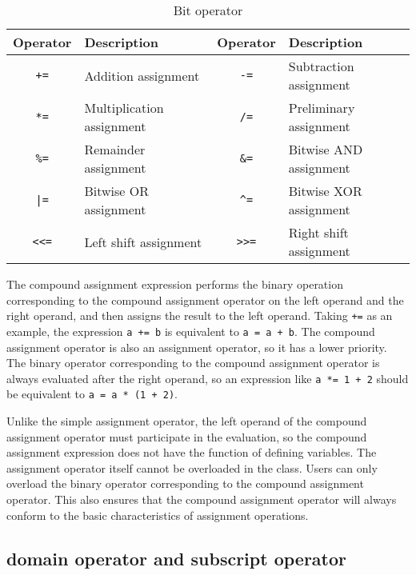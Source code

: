 \begin{table}[htb]
    \centering
    \setlength{\tabcolsep}{10mm}
    \begin{tabular}{clcl} \toprule
        \textbf{Operator} & \textbf{Description} & \textbf{Operator} & \textbf{Description} \\ \midrule
        \texttt{+=} & Addition assignment & \texttt{-=} & Subtraction assignment \\
        \texttt{*=} & Multiplication assignment & \texttt{/=} & Preliminary assignment \\
        \texttt{\%=} & Remainder assignment & \texttt{\&=} & Bitwise AND assignment \\
        \texttt{|=} & Bitwise OR assignment & \texttt{\textasciicircum=} & Bitwise XOR assignment \\
        \texttt{<<=} & Left shift assignment & \texttt{>>=} & Right shift assignment \\
        \bottomrule
    \end{tabular}
    \caption{Bit operator}
    \label{tab::compound_assign}
\end{table}

The compound assignment expression performs the binary operation corresponding to the compound assignment operator on the left operand and the right operand, and then assigns the result to the left operand. Taking \texttt{+=} as an example, the expression \texttt{a += b} is equivalent to \texttt{a = a + b}. The compound assignment operator is also an assignment operator, so it has a lower priority. The binary operator corresponding to the compound assignment operator is always evaluated after the right operand, so an expression like \texttt{a *= 1 + 2} should be equivalent to \texttt{a = a * (1 + 2)}.

Unlike the simple assignment operator, the left operand of the compound assignment operator must participate in the evaluation, so the compound assignment expression does not have the function of defining variables. The assignment operator itself cannot be overloaded in the class. Users can only overload the binary operator corresponding to the compound assignment operator. This also ensures that the compound assignment operator will always conform to the basic characteristics of assignment operations.

\subsection {domain operator and subscript operator}

